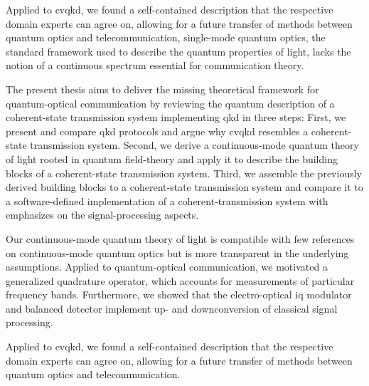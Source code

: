 Applied to \gls{cvqkd}, we found a self-contained description that the respective domain experts can agree on, allowing for a future transfer of methods between quantum optics and telecommunication, single-mode quantum optics, the standard framework used to describe the quantum properties of light, lacks the notion of a continuous spectrum essential for communication theory.

The present thesis aims to deliver the missing theoretical framework for quantum-optical communication by reviewing the quantum description of a coherent-state transmission system implementing \gls{qkd} in three steps:
First, we present and compare \gls{qkd} protocols and argue why \gls{cvqkd} resembles a coherent-state transmission system.
Second, we derive a continuous-mode quantum theory of light rooted in quantum field-theory and apply it to describe the building blocks of a coherent-state transmission system.
Third, we assemble the previously derived building blocks to a coherent-state transmission system and compare it to a software-defined implementation of a coherent-transmission system with emphasizes on the signal-processing aspects.

Our continuous-mode quantum theory of light is compatible with few references on continuous-mode quantum optics but is more transparent in the underlying assumptions.
Applied to quantum-optical communication, we motivated a generalized quadrature operator, which accounts for measurements of particular frequency bands.
Furthermore, we showed that the electro-optical \gls{iq} modulator and balanced detector implement up- and downconversion of classical signal processing.

Applied to \gls{cvqkd}, we found a self-contained description that the respective domain experts can agree on, allowing for a future transfer of methods between quantum optics and telecommunication.